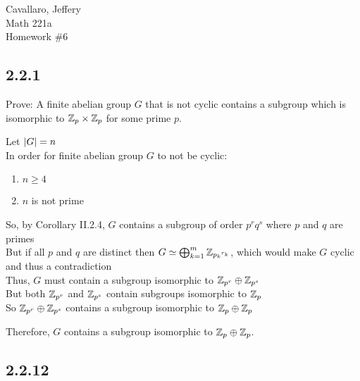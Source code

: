 \documentclass[letterpaper,12pt,fleqn]{article}
\begin{document}
Cavallaro, Jeffery \\
Math 221a \\
Homework \#6

\bigskip

\subsection*{2.2.1}

Prove: A finite abelian group $G$ that is not cyclic contains a subgroup which
is isomorphic to $\mathbb{Z}_p\times\mathbb{Z}_p$ for some prime $p$.

Let $\lvert G\rvert=n$ \\
In order for finite abelian group $G$ to not be cyclic:
\begin{enumerate}
\item $n\ge4$
\item $n$ is not prime
\end{enumerate}
So, by Corollary II.2.4, $G$ contains a subgroup of order $p^rq^s$ where
$p$ and $q$ are primes \\
But if all $p$ and $q$ are distinct then $G\simeq\bigoplus_{k=1}^m\mathbb{Z}_{{p_k}^{r_k}}$,
which would make $G$ cyclic and thus a contradiction \\
Thus, $G$ must contain a subgroup isomorphic to $\mathbb{Z}_{p^r}\oplus\mathbb{Z}_{p^s}$ \\
But both $\mathbb{Z}_{p^r}$ and $\mathbb{Z}_{p^s}$ contain subgroups isomorphic to $\mathbb{Z}_p$ \\
So $\mathbb{Z}_{p^r}\oplus\mathbb{Z}_{p^s}$ contains a subgroup isomorphic to $\mathbb{Z}_p\oplus\mathbb{Z}_p$

Therefore, $G$ contains a subgroup isomorphic to $\mathbb{Z}_p\oplus\mathbb{Z}_p$.

\subsection*{2.2.12}
\end{document}
